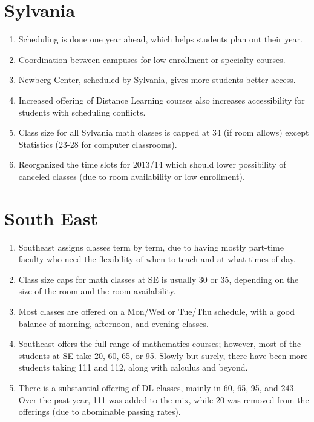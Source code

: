 \section{Sylvania}
\begin{enumerate}
    \item  Scheduling is done one year ahead, which helps students plan out
      their year.
    \item  Coordination between campuses for low enrollment or specialty
      courses.
    \item  Newberg Center, scheduled by Sylvania, gives more students better
      access.
    \item  Increased offering of Distance Learning courses also increases
      accessibility for students with scheduling conflicts.
	\item  Class size for all Sylvania math classes is capped at 34 (if room allows) except
    Statistics (23-28 for computer classrooms).
	\item  Reorganized the time slots for 2013/14 which should lower possibility of canceled classes (due 
	to room availability or low enrollment).
\end{enumerate}

\section{South East}
\begin{enumerate}
  \item Southeast assigns classes term by term, due to having mostly part-time
    faculty who need the flexibility of when to teach and at what times of day.
  \item Class size caps for math classes at SE is usually 30 or 35, depending
    on the size of the room and the room availability.  
  \item Most classes are offered on a Mon/Wed or Tue/Thu schedule, with a good
    balance of morning, afternoon, and evening classes.
  \item Southeast offers the full range of mathematics courses; however, most
    of the students at SE take 20, 60, 65, or 95.  Slowly but surely, there
    have been more students taking 111 and 112, along with calculus and beyond.
  \item There is a substantial offering of DL classes, mainly in 60, 65, 95,
    and 243.  Over the past year, 111 was added to the mix, while 20 was
    removed from the offerings (due to abominable passing rates).
\end{enumerate}
